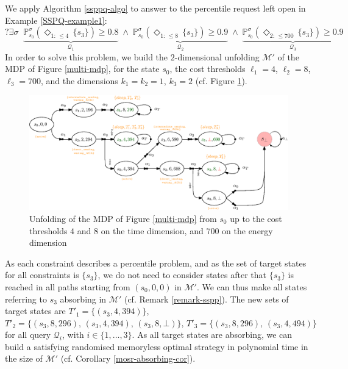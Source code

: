 \begin{example}
  We apply Algorithm \ref{ssppq-algo} to answer to the percentile request left open in Example \ref{SSPQ-example1}:
  \[
  ?\exists \sigma \;\; \underbrace{\mathbb{P}^{\sigma}_{s_0}(\Diamond_{1: \, \leq 4} \, \{s_3\}) \geq 0.8}_{\mathcal{Q}_1} \; \wedge \;
   \underbrace{\mathbb{P}^{\sigma}_{s_0}(\Diamond_{1: \, \leq 8} \, \{s_3\}) \geq 0.9}_{\mathcal{Q}_2} \; \wedge \;
  \underbrace{\mathbb{P}_{s_0}^{\sigma}(\Diamond_{2: \, \leq 700} \, \{s_3\}) \geq 0.9}_{\mathcal{Q}_3}
  \]
  In order to solve this \SSPPQ{} problem, we build the $2$-dimensional unfolding $\mathcal{M'}$ of the MDP of Figure \ref{multi-mdp}, for the state $s_0$, the cost thresholds $\ell_1 = 4$, $\ell_2 = 8$, $\ell_3 = 700$, and the dimensions $k_1 = k_2 = 1$, $k_3 = 2$ (cf. Figure \ref{multi-unfolding}).
  \begin{figure}[h]
    \centering
    \includegraphics[width=\linewidth]{resources/SSP-PQ-unfolding}
    \captionsetup{justification=centering}
    \caption{Unfolding of the MDP of Figure \ref{multi-mdp} from $s_0$ up to the cost thresholds $4$ and $8$ on the time dimension, and $700$ on the energy dimension}
    \label{multi-unfolding}
  \end{figure}
  As each constraint describes a percentile problem,
  and as the set of target states for all constraints is $\{s_3\}$, we do not need to consider states after that $\{s_3\}$ is reached in all paths starting from $(s_0, 0, 0)$ in $\mathcal{M}'$.
  We can thus make all states referring to $s_3$  absorbing in $\mathcal{M}'$ (cf. Remark \ref{remark-sspp}).
  The new sets of target states are $T'_1 = \{(s_3, 4, 394)\}$, $T'_2 = \{(s_3, 8, 296), \, (s_3, 4, 394), \, (s_3, 8, \bot)\}, \, T'_3 = \{ (s_3, 8, 296), \, (s_3, 4, 494) \}$
  for all query $\mathcal{Q}_i$, with $i \in \{1, \dots, 3\}$. As all target states are absorbing, we can build a satisfying randomised memoryless optimal strategy in polynomial time in the size of $\mathcal{M}'$ (cf. Corollary \ref{mosr-absorbing-cor}).

\end{example}
